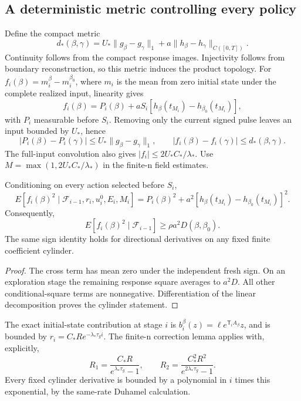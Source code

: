 \subsection{A deterministic metric controlling every policy}
Define the compact metric
\begin{equation}
 d_*(\beta,\gamma)=U_*\|g_\beta-g_\gamma\|_1
                  +a\|h_\beta-h_\gamma\|_{C([0,T])}.
 \label{eq:policy-controlling-metric}
\end{equation}
Continuity follows from the compact response images. Injectivity follows
from boundary reconstruction, so this metric induces the product topology.
For \(f_i(\beta)=m_i^\beta-m_i^{\beta_0}\), where \(m_i\) is the mean
from zero initial state under the complete realized input, linearity gives
\begin{equation}
 f_i(\beta)=P_i(\beta)+aS_i[h_\beta(t_{M_i})-h_{\beta_0}(t_{M_i})],
 \label{eq:predictable-intercept-decomposition}
\end{equation}
with \(P_i\) measurable before \(S_i\). Removing only the current signed
pulse leaves an input bounded by \(U_*\), hence
\[
 |P_i(\beta)-P_i(\gamma)|\le U_*\|g_\beta-g_\gamma\|_1,
 \qquad |f_i(\beta)-f_i(\gamma)|\le d_*(\beta,\gamma).
\]
The full-input convolution also gives \(|f_i|\le2U_*C_*/\lambda_*\).
Use \(M=\max(1,2U_*C_*/\lambda_*)\) in the finite-n field estimates.

\begin{lemma}
\label{lem:predictable-intercept-information}
Conditioning on every action selected before \(S_i\),
\[
 E[f_i(\beta)^2\mid\mathcal F_{i-1},r_i,u_i^0,E_i,M_i]
 =P_i(\beta)^2+a^2[h_\beta(t_{M_i})-h_{\beta_0}(t_{M_i})]^2.
\]
Consequently,
\begin{equation}
 E[f_i(\beta)^2\mid\mathcal F_{i-1}]\ge\rho a^2D(\beta,\beta_0).
 \label{eq:linear-time-information-floor}
\end{equation}
The same sign identity holds for directional derivatives on any fixed
finite coefficient cylinder.
\end{lemma}
\begin{proof}
The cross term has mean zero under the independent fresh sign. On an
exploration stage the remaining response square averages to \(a^2D\).
All other conditional-square terms are nonnegative. Differentiation of the
linear decomposition proves the cylinder statement.
\end{proof}

The exact initial-state contribution at stage \(i\) is
\(b_i^\beta(z)=\ell e^{\mathsf T_iA_\beta}z\), and is bounded by
\(r_i=C_*R e^{-\lambda_*\tau_gi}\). The finite-n correction lemma applies
with, explicitly,
\[
 R_1=\frac{C_*R}{e^{\lambda_*\tau_g}-1},\qquad
 R_2=\frac{C_*^2R^2}{e^{2\lambda_*\tau_g}-1}.
\]
Every fixed cylinder derivative is bounded by a polynomial in \(i\)
times this exponential, by the same-rate Duhamel calculation.

